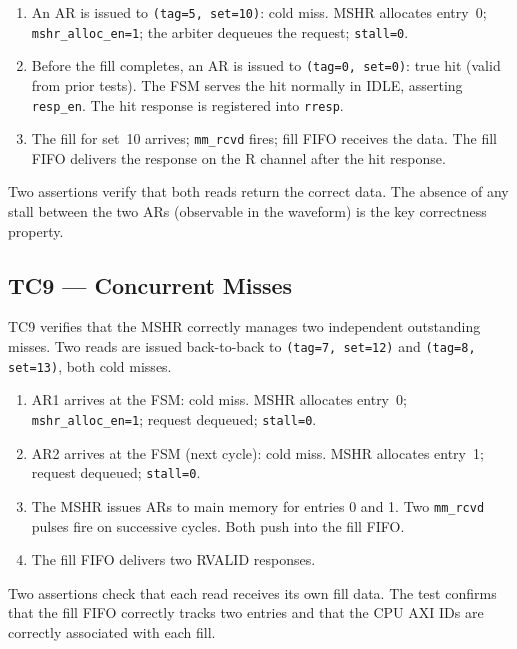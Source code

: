 \documentclass[12pt,letterpaper]{report}
\begin{document}
\begin{enumerate}[label=\arabic*.]
  \item An AR is issued to \texttt{(tag=5, set=10)}: cold miss.
        MSHR allocates entry~0; \texttt{mshr\_alloc\_en=1}; the
        arbiter dequeues the request; \texttt{stall=0}.
  \item Before the fill completes, an AR is issued to
        \texttt{(tag=0, set=0)}: true hit (valid from prior tests).
        The FSM serves the hit normally in IDLE, asserting
        \texttt{resp\_en}.  The hit response is registered into
        \texttt{rresp}.
  \item The fill for set~10 arrives; \texttt{mm\_rcvd} fires;
        fill FIFO receives the data.  The fill FIFO delivers the
        response on the R channel after the hit response.
\end{enumerate}

Two assertions verify that both reads return the correct data.
The absence of any stall between the two ARs (observable in the
waveform) is the key correctness property.

\subsection{TC9 — Concurrent Misses}
\label{sec:tc9}

TC9 verifies that the MSHR correctly manages two independent
outstanding misses.  Two reads are issued back-to-back to
\texttt{(tag=7, set=12)} and \texttt{(tag=8, set=13)}, both cold
misses.

\begin{enumerate}[label=\arabic*.]
  \item AR1 arrives at the FSM: cold miss.  MSHR allocates entry~0;
        \texttt{mshr\_alloc\_en=1}; request dequeued; \texttt{stall=0}.
  \item AR2 arrives at the FSM (next cycle): cold miss.  MSHR
        allocates entry~1; request dequeued; \texttt{stall=0}.
  \item The MSHR issues ARs to main memory for entries 0 and 1.
        Two \texttt{mm\_rcvd} pulses fire on successive cycles.
        Both push into the fill FIFO.
  \item The fill FIFO delivers two RVALID responses.
\end{enumerate}

Two assertions check that each read receives its own fill data.
The test confirms that the fill FIFO correctly tracks two entries
and that the CPU AXI IDs are correctly associated with each fill.
\end{document}
